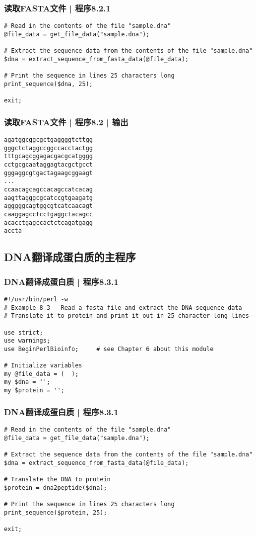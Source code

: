\begin{frame}[fragile]
  \frametitle{读取FASTA文件 | 程序8.2.1}
\begin{lstlisting}[firstnumber=12]
# Read in the contents of the file "sample.dna"
@file_data = get_file_data("sample.dna");

# Extract the sequence data from the contents of the file "sample.dna"
$dna = extract_sequence_from_fasta_data(@file_data);

# Print the sequence in lines 25 characters long
print_sequence($dna, 25);

exit;
\end{lstlisting}
\end{frame}

\begin{frame}[fragile]
  \frametitle{读取FASTA文件 | 程序8.2 | 输出}
\begin{lstlisting}
agatggcggcgctgaggggtcttgg
gggctctaggccggccacctactgg
tttgcagcggagacgacgcatgggg
cctgcgcaataggagtacgctgcct
gggaggcgtgactagaagcggaagt
...
ccaacagcagccacagccatcacag
aagttagggcgcatccgtgaagatg
agggggcagtggcgtcatcaacagt
caaggagcctcctgaggctacagcc
acacctgagccactctcagatgagg
accta
\end{lstlisting}
\end{frame}

\subsection{DNA翻译成蛋白质的主程序}
\begin{frame}[fragile]
  \frametitle{DNA翻译成蛋白质 | 程序8.3.1}
\begin{lstlisting}[firstnumber=1]
#!/usr/bin/perl -w
# Example 8-3   Read a fasta file and extract the DNA sequence data
# Translate it to protein and print it out in 25-character-long lines

use strict;
use warnings;
use BeginPerlBioinfo;     # see Chapter 6 about this module

# Initialize variables
my @file_data = (  );
my $dna = '';
my $protein = '';
\end{lstlisting}
\end{frame}

\begin{frame}[fragile]
  \frametitle{DNA翻译成蛋白质 | 程序8.3.1}
\begin{lstlisting}[firstnumber=13]
# Read in the contents of the file "sample.dna"
@file_data = get_file_data("sample.dna");

# Extract the sequence data from the contents of the file "sample.dna"
$dna = extract_sequence_from_fasta_data(@file_data);

# Translate the DNA to protein
$protein = dna2peptide($dna);

# Print the sequence in lines 25 characters long
print_sequence($protein, 25);

exit;
\end{lstlisting}
\end{frame}

